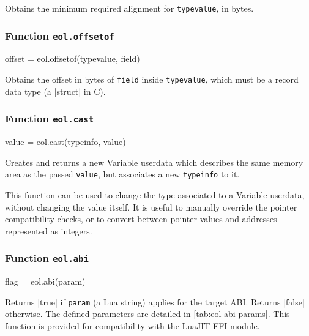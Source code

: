 Obtains the minimum required alignment for \texttt{typevalue}, in bytes.


\subsubsection{Function \texttt{eol.offsetof}}
	\label{sec:eol-api-offsetof}

\begin{luacode}
offset = eol.offsetof(typevalue, field)
\end{luacode}

Obtains the offset in bytes of \texttt{field} inside \texttt{typevalue}, which
must be a record data type (a \Mc|struct| in C).

\subsubsection{Function \texttt{eol.cast}}
	\label{sec:eol-api-cast}

\begin{luacode}
	value = eol.cast(typeinfo, value)
\end{luacode}

Creates and returns a new \textsf{Variable} userdata which describes the same
memory area as the passed \texttt{value}, but associates a new
\texttt{typeinfo} to it.

This function can be used to change the type associated to a \textsf{Variable}
userdata, without changing the value itself. It is useful to manually override
the pointer compatibility checks, or to convert between pointer values and
addresses represented as integers.

%
%
%
%
%


\subsubsection{Function \texttt{eol.abi}}
	\label{sec:eol-api-abi}

\begin{luacode}
flag = eol.abi(param)
\end{luacode}

Returns \Mlua|true| if \texttt{param} (a Lua string) applies for the target
\gls{ABI}. Returns \Mlua|false| otherwise. The defined parameters are detailed
in \autoref{tab:eol-abi-params}. This function is provided for compatibility
with the LuaJIT FFI module.

